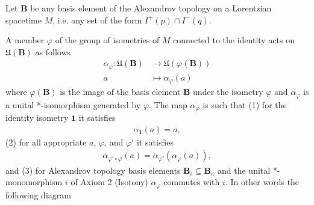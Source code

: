 \begin{definition}
    \label{def:isometric-covariance-in-curved-spacetime}
    \leanok
    Let $\mathbf{B}$ be any basis element of the Alexandrov topology on a Lorentzian spacetime $M$, i.e. any set of the form $I^+(p) \cap I^-(q)$.
    
    A member $\varphi$ of the group of isometries of $M$ connected to the identity acts on $\mathfrak{U}(\mathbf{B})$ as follows
    \begin{align}
        \alpha_\varphi : \mathfrak{U}(\mathbf{B}) &\longrightarrow \mathfrak{U}(\varphi(\mathbf{B})) \\
                                   a              &\longmapsto     \alpha_\varphi(a)
    \end{align}
    where $\varphi(\mathbf{B})$ is the image of the basis element $\mathbf{B}$ under the isometry $\varphi$ and $\alpha_\varphi$ is a unital *-isomorphism generated by $\varphi$. The map $\alpha_\varphi$ is such that (1) for the identity isometry $\mathbf{1}$ it satisfies
    \begin{align}
        \alpha_{\mathbf{1}}(a) = a,
    \end{align}
    (2) for all appropriate $a$, $\varphi$, and $\varphi'$ it satisfies
    \begin{align}
        \alpha_{\varphi' \circ \varphi}(a) = \alpha_{\varphi'}(\alpha_{\varphi}(a)),
    \end{align}
    and (3) for Alexandrov topology basis elements $\mathbf{B}_\iota \subseteq \mathbf{B}_\kappa$ and the unital *-monomorphism $i$ of Axiom 2 (Isotony) $\alpha_\varphi$ commutes with $i$. In other words the following diagram

    \begin{center}
    \end{center}


\end{definition}
